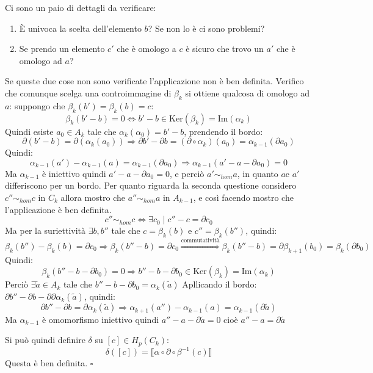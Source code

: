 \documentclass[10pt, twoside=false, x11names]{scrbook}
\newenvironment{proof}{{\textbf{Dimostrazione}:}}{\hfill $\square$}
\newcommand{\im}[1]{\mathrm{Im}( #1 )}
\renewcommand{\ker}[1]{\mathrm{Ker}( #1)}
\begin{document}
\begin{proof}
  Ci sono un paio di dettagli da verificare:
  \begin{enumerate}
  \item È univoca la scelta dell'elemento $ b $? Se non lo è ci sono
    problemi?
  \item Se prendo un elemento $ c' $ che è omologo
    a $ c $ è sicuro che trovo un $ a' $ che è
    omologo ad $ a $?
  \end{enumerate}
  Se queste due cose non sono verificate l'applicazione non è
  ben definita.
  Verifico che comunque scelga una controimmagine di $ \beta_k $ si ottiene
  qualcosa di omologo ad $ a $: suppongo che $ \beta_k (b') = \beta_k (b) = c $:
  \[
    \beta_k(b' - b) = 0 \iff b' - b \in \ker{\beta_k} = \im{\alpha_k}
  \]
  Quindi esiste $ a_0 \in A_k $ tale che $ \alpha_k(\alpha_0) = b' - b $, prendendo
  il bordo:
  \[
    \partial ( b' - b ) = \partial ( \alpha_k (a_0 )) \Rightarrow \partial b' - \partial b = (\partial \circ \alpha_k)(a_0) = \alpha_{k-1}(\partial a_0)
  \]
  Quindi:
  \[
    \alpha_{k-1}(a') - \alpha_{k-1}(a) = \alpha_{k-1}(\partial a_0) \Rightarrow \alpha_{k-1}(a' - a - \partial a_0) = 0
  \]
  Ma $ \alpha_{k-1} $ è iniettivo quindi $ a' - a - \partial a_0 = 0 $, e perciò  $ a' \sim_{hom} a $,
  in quanto $ a $e $ a' $ differiscono per un bordo.
  Per quanto riguarda la seconda questione considero $ c'' \sim_{hom} c $ in $ C_k $
  allora mostro che $ a'' \sim_{hom} a $ in $ A_{k-1} $, e così facendo
  mostro che l'applicazione è ben definita.
  \[
    c'' \sim_{hom} c \iff \exists c_0 \; | \; c'' - c = \partial c_0
  \]
  Ma per la suriettività $ \exists b, b'' $ tale che $ c = \beta_k(b) $ e
  $ c'' = \beta_k(b'') $, quindi:
  \[
    \beta_k(b'') - \beta_k(b) = \partial c_0 \Rightarrow \beta_k(b'' - b) = \partial c_0  \overset{\text{commutatività}}{\Rightarrow}
    \beta_k(b''-b) = \partial \beta_{k+1}(b_0) = \beta_{k}(\partial b_0)
  \]
  Quindi:
  \[
    \beta_k(b'' - b - \partial b_0) = 0 \Rightarrow b'' - b - \partial b_0 \in \ker{\beta_k} = \im{\alpha_k}
  \]
  Perciò $ \exists \tilde{a} \in A_k$ tale che $ b'' - b - \partial b_0 = \alpha_k (\tilde{a}) $
  Apllicando il bordo: $ \partial b'' - \partial b - \partial \partial \alpha_k(\tilde{a}) $, quindi:
  \[
    \partial b'' - \partial b = \partial \alpha_{k}(\tilde{a}) \Rightarrow \alpha_{k+1}(a'') - \alpha_{k-1}(a) = \alpha_{k-1}(\partial \tilde{a})
  \]
  Ma $ \alpha_{k-1} $ è omomorfismo iniettivo quindi
  $ a'' - a - \partial \tilde{a} = 0 $ cioè $ a'' - a = \partial \tilde{a} $

  Si può quindi definire $ \delta $ su $ [c] \in H_p(C_k) $:
  \[
    \delta([c]) = \llbracket \alpha \circ \partial \circ \beta^{-1}(c) \rrbracket
  \]
  Questa è ben definita.
\end{proof}
\end{document}
